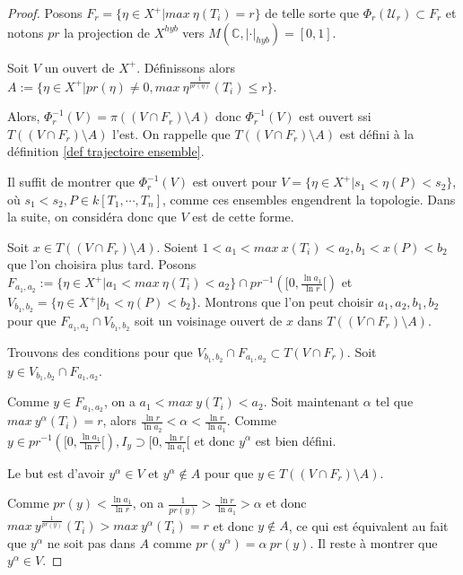 \documentclass[11pt]{article}
\newcommand{\C}{\mathbb{C}}
\begin{document}
\begin{proof}
Posons $F_r = \lbrace \eta \in X^+ | max~\eta(T_i) = r \rbrace$ de telle sorte que $\Phi_r(\mathcal{U}_r) \subset F_r$ et notons $pr$ la projection de $X^{hyb}$ vers $M(\C, |\cdot|_{hyb}) = [0,1]$.

Soit $V$ un ouvert de $X^+$. Définissons alors $A := \lbrace \eta\in X^+ | pr(\eta)\neq 0, max~\eta^{\frac{1}{pr(\eta)}}(T_i) \leq r\rbrace$.

Alors, $\Phi_r^{-1}(V) = \pi((V \cap F_r) \setminus A)$ donc $\Phi_r^{-1}(V)$ est ouvert ssi $T((V \cap F_r) \setminus A)$ l'est. On rappelle que $T((V \cap F_r) \setminus A)$ est défini à la définition \ref{def trajectoire ensemble}. 

Il suffit de montrer que $\Phi_r^{-1}(V)$ est ouvert pour $V = \lbrace \eta \in X^+ | s_1 < \eta(P) < s_2 \rbrace$, où $s_1 < s_2, P \in k[T_1, \cdots, T_n]$, comme ces ensembles engendrent la topologie. Dans la suite, on considéra donc que $V$ est de cette forme.

Soit $x \in T((V\cap F_r)\setminus A)$. Soient $1 < a_1 < max~x(T_i) < a_2, b_1 < x(P) < b_2$ que l'on choisira plus tard. Posons $F_{a_1, a_2} := \lbrace \eta \in X^+| a_1 < max~\eta(T_i) < a_2 \rbrace \cap pr^{-1}([0, \frac{\ln a_1}{\ln r}[)$ et $V_{b_1, b_2} = \lbrace \eta \in X^+ | b_1 < \eta(P) < b_2 \rbrace$. Montrons que l'on peut choisir $a_1, a_2, b_1, b_2$ pour que $F_{a_1, a_2} \cap V_{b_1, b_2}$ soit un voisinage ouvert de $x$ dans $T((V \cap F_r)\setminus A)$.

Trouvons des conditions pour que $V_{b_1, b_2} \cap F_{a_1, a_2} \subset T(V \cap F_r)$. Soit $y \in V_{b_1, b_2} \cap F_{a_1, a_2}$.

Comme $y \in F_{a_1, a_2}$, on a $a_1 < max~y(T_i) <a_2$. Soit maintenant $\alpha$ tel que $max~y^\alpha(T_i) = r$, alors $\frac{\ln r}{\ln a_2} < \alpha < \frac{\ln r}{\ln a_1}$. Comme $y \in pr^{-1}([0, \frac{\ln a_1}{\ln r}[), I_y \supset [0, \frac{\ln r}{\ln a_1}[$ et donc $y^\alpha$ est bien défini.

Le but est d'avoir $y^\alpha \in V$ et $y^\alpha \notin A$ pour que $y \in T((V\cap F_r)\setminus A)$. 

Comme $pr(y) < \frac{\ln a_1}{\ln r}$, on a $\frac{1}{pr(y)} > \frac{\ln r}{\ln a_1} > \alpha$ et donc $max~y^{\frac{1}{pr(y)}}(T_i) > max~y^\alpha(T_i) = r$ et donc $y \notin A$, ce qui est équivalent au fait que $y^\alpha$ ne soit pas dans $A$ comme $pr(y^\alpha) = \alpha ~ pr(y)$. Il reste à montrer que $y^\alpha \in V$.


\end{proof}
\end{document}
